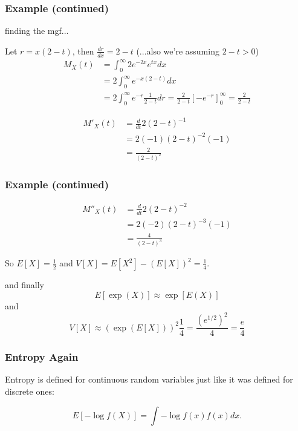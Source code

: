 \documentclass{beamer}
\begin{document}
\begin{frame}
\frametitle{Example (continued)}

finding the mgf...

Let $r = x(2 - t)$, then $\frac{dr}{dx} = 2-t$ (...also we're assuming $2-t>0$)
\begin{align*}
M_X(t) &= \int_0^{\infty}2 e^{-2x} e^{tx}dx \\
&= 2 \int_0^{\infty} e^{-x(2 - t)}dx \\
&= 2 \int_0^{\infty} e^{-r} \frac{1}{2-t}dr = \frac{2}{2-t} [-e^{-r}]_{0}^{\infty} =\frac{2}{2-t}
\end{align*}
\pause

\begin{align*}
M'_X(t) &= \frac{d}{dt} 2(2-t)^{-1} \\
&= 2(-1)(2-t)^{-2}(-1) \\
&=  \frac{2}{(2-t)^{2}}
\end{align*}


\end{frame}

\begin{frame}
\frametitle{Example (continued)}

\begin{align*}
M''_X(t) &= \frac{d}{dt} 2(2-t)^{-2} \\
&= 2(-2)(2-t)^{-3}(-1) \\
&= \frac{4}{(2-t)^{3}}
\end{align*}
\pause

So $E[X] = \frac{1}{2}$ and $V[X] = E[X^2] - (E[X])^2 = \frac{1}{4}$.
\pause
\newline

and finally
\[
E[\exp(X)] \approx \exp[E(X)]
\]
and
\[
V[X] \approx (\exp(E[X]))^2\frac{1}{4} = \frac{(e^{1/2})^2}{4} = \frac{e}{4}
\]

\end{frame}

\begin{frame}
\frametitle{Entropy Again}

Entropy is defined for continuous random variables just like it was defined for discrete ones:

\[
E[-\log f(X)] = \int - \log f(x) f(x) dx.
\]

\end{frame}
\end{document}
